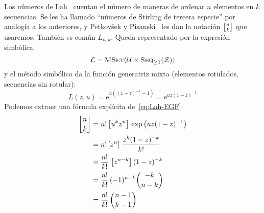   Los números de Lah~%
    \cite{lah54:_new_kind_number}
  cuentan el número de maneras
  de ordenar \(n\) elementos en \(k\) secuencias.
  Se les ha llamado ``números de Stirling de tercera especie''
  por analogía a los anteriores,
  y Petkovšek y Pisanski~%
    \cite{petko02:_combin_lah_stirling}
  les dan la notación \(\lah{n}{k}\) que usaremos.
  También es común \(L_{n, k}\).
  Queda representado por la expresión simbólica:%
  \begin{equation*}
    \mathcal{L}
      = \operatorname{\textsc{MSet}}(\mathcal{U} \times \operatorname{\textsc{Seq}}_{\ge 1}(\mathcal{Z}))
  \end{equation*}
  y el método simbólico da la función generatriz mixta%
  (elementos rotulados,
   secuencias sin rotular):
  \begin{equation}
    \label{eq:Lah-EGF}
    L(z, u)
      = \mathrm{e}^{u ((1 - z)^{-1} - 1)}
      = \mathrm{e}^{u z (1 - z)^{-1}}
  \end{equation}
  Podemos extraer una fórmula explícita de~\eqref{eq:Lah-EGF}:%
  \begin{align}
    \lah{n}{k}
      &= n! \left[ u^k z^n \right]
	      \, \exp \left( u z (1 - z)^{-1} \right) \\
      &= n! \left[ z^n \right] \, \frac{z^k (1 - z)^{-k}}{k!} \\
      &= \frac{n!}{k!} \, \left[ z^{n - k} \right] (1 - z)^{-k} \\
      &= \frac{n!}{k!} \, (-1)^{n - k} \binom{-k}{n - k} \\
      &= \frac{n!}{k!} \, \binom{n - 1}{k - 1}
  \end{align}

